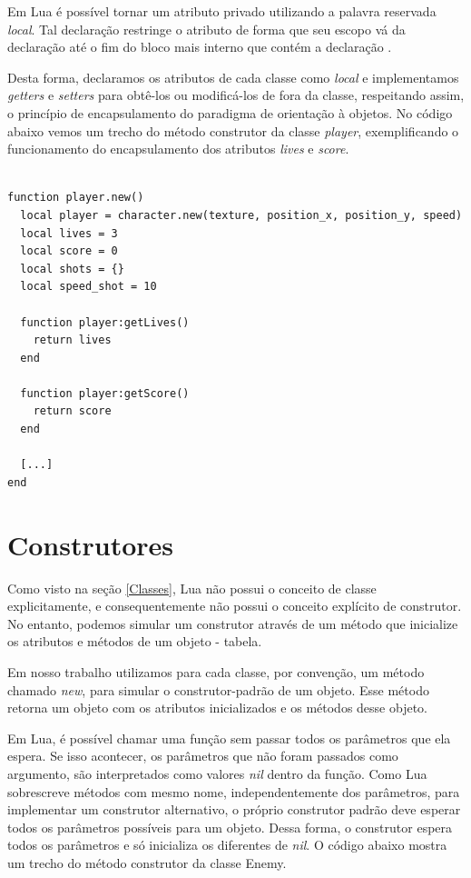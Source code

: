 \documentclass[rel_mlp]{iiufrgs}
\begin{document}
Em Lua é possível tornar um atributo privado utilizando a palavra reservada \textit{local}. Tal declaração restringe o atributo de forma que seu escopo vá da declaração até o fim do bloco mais interno que contém a declaração \citep{IntroLuaPDF}.

Desta forma, declaramos os atributos de cada classe como \textit{local} e implementamos \textit{getters} e \textit{setters} para obtê-los ou modificá-los de fora da classe, respeitando assim, o princípio de encapsulamento do paradigma de orientação à objetos. No código abaixo vemos um trecho do método construtor da classe \textit{player}, exemplificando o funcionamento do encapsulamento dos atributos \textit{lives} e \textit{score}.

\clearpage

\begin{lstlisting}

function player.new()
  local player = character.new(texture, position_x, position_y, speed)
  local lives = 3
  local score = 0
  local shots = {}
  local speed_shot = 10

  function player:getLives()
    return lives
  end

  function player:getScore()
    return score
  end
  
  [...]
end

\end{lstlisting}



\section{Construtores} \label{Construtores}

Como visto na seção \ref{Classes}, Lua não possui o conceito de classe explicitamente, e consequentemente não possui o conceito explícito de construtor. No entanto, podemos simular um construtor através de um método que inicialize os atributos e métodos de um objeto - tabela. 

Em nosso trabalho utilizamos para cada classe, por convenção, um método chamado \textit{new}, para simular o construtor-padrão de um objeto. Esse método retorna um objeto com os atributos inicializados e os métodos desse objeto.

Em Lua, é possível chamar uma função sem passar todos os parâmetros que ela espera. Se isso acontecer, os parâmetros que não foram passados como argumento, são interpretados como valores \textit{nil} dentro da função. Como Lua sobrescreve métodos com mesmo nome, independentemente dos parâmetros, para implementar um construtor alternativo, o próprio construtor padrão deve esperar todos os parâmetros possíveis para um objeto. Dessa forma, o construtor espera todos os parâmetros e só inicializa os diferentes de \textit{nil}. O código abaixo mostra um trecho do método construtor da classe Enemy.
\end{document}
